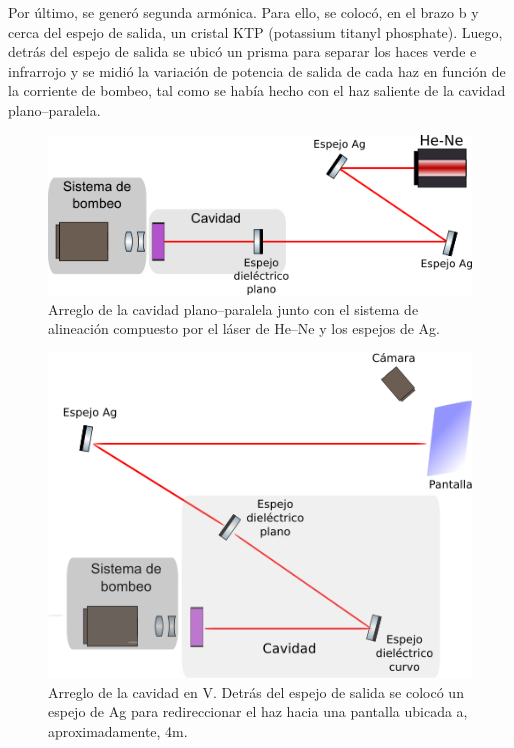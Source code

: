 \documentclass[10pt, a4paper]{article}%
\begin{document}
\begin{multicols}{2}
Por último, se generó segunda armónica. Para ello, se colocó, en el brazo b y cerca del espejo de salida, un cristal KTP (potassium titanyl phosphate). Luego, detrás del espejo de salida se ubicó un prisma para separar los haces verde e infrarrojo y se midió la variación de potencia de salida de cada haz en función de la corriente de bombeo, tal como se había hecho con el haz saliente de la cavidad plano--paralela.   



\begin{figure}[H]
    \centering
    \includegraphics[scale=0.5]{Graficos/cavplana.png}
    \caption{Arreglo de la cavidad plano--paralela junto con el sistema de alineación compuesto por el láser de He--Ne y los espejos de Ag.}
    \label{cavplana}
\end{figure}



\begin{figure}[H]
    \centering
    \includegraphics[scale=0.5]{Graficos/cavV1.png}
    \caption{Arreglo de la cavidad en V. Detrás del espejo de salida se colocó un espejo de Ag para redireccionar el haz hacia una pantalla ubicada a, aproximadamente, 4m.}
    \label{cavV1}
\end{figure}


\end{multicols}
\end{document}

